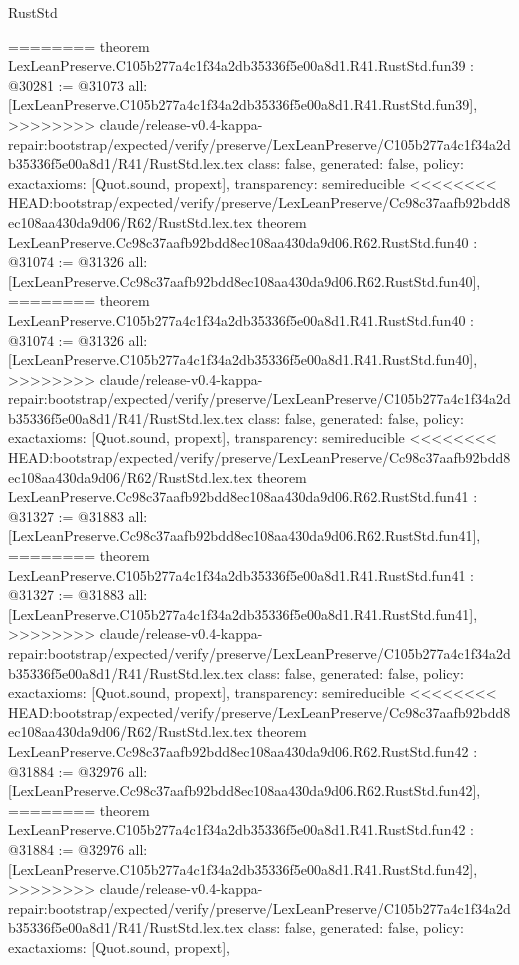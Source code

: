\begin{lexlean}{RustStd}
\begin{coremodule}
{\begin{coremodule}
{{{{{{{{{{{{{{{{{{{{{{{{{{{{{{{{{{{{{{{{{{========
theorem LexLeanPreserve.C105b277a4c1f34a2db35336f5e00a8d1.R41.RustStd.fun39 : @30281 := @31073 {
  all: [LexLeanPreserve.C105b277a4c1f34a2db35336f5e00a8d1.R41.RustStd.fun39],
>>>>>>>> claude/release-v0.4-kappa-repair:bootstrap/expected/verify/preserve/LexLeanPreserve/C105b277a4c1f34a2db35336f5e00a8d1/R41/RustStd.lex.tex
  class: false,
  generated: false,
  policy: exact{axioms: [Quot.sound, propext]},
  transparency: semireducible
}
<<<<<<<< HEAD:bootstrap/expected/verify/preserve/LexLeanPreserve/Cc98c37aafb92bdd8ec108aa430da9d06/R62/RustStd.lex.tex
theorem LexLeanPreserve.Cc98c37aafb92bdd8ec108aa430da9d06.R62.RustStd.fun40 : @31074 := @31326 {
  all: [LexLeanPreserve.Cc98c37aafb92bdd8ec108aa430da9d06.R62.RustStd.fun40],
========
theorem LexLeanPreserve.C105b277a4c1f34a2db35336f5e00a8d1.R41.RustStd.fun40 : @31074 := @31326 {
  all: [LexLeanPreserve.C105b277a4c1f34a2db35336f5e00a8d1.R41.RustStd.fun40],
>>>>>>>> claude/release-v0.4-kappa-repair:bootstrap/expected/verify/preserve/LexLeanPreserve/C105b277a4c1f34a2db35336f5e00a8d1/R41/RustStd.lex.tex
  class: false,
  generated: false,
  policy: exact{axioms: [Quot.sound, propext]},
  transparency: semireducible
}
<<<<<<<< HEAD:bootstrap/expected/verify/preserve/LexLeanPreserve/Cc98c37aafb92bdd8ec108aa430da9d06/R62/RustStd.lex.tex
theorem LexLeanPreserve.Cc98c37aafb92bdd8ec108aa430da9d06.R62.RustStd.fun41 : @31327 := @31883 {
  all: [LexLeanPreserve.Cc98c37aafb92bdd8ec108aa430da9d06.R62.RustStd.fun41],
========
theorem LexLeanPreserve.C105b277a4c1f34a2db35336f5e00a8d1.R41.RustStd.fun41 : @31327 := @31883 {
  all: [LexLeanPreserve.C105b277a4c1f34a2db35336f5e00a8d1.R41.RustStd.fun41],
>>>>>>>> claude/release-v0.4-kappa-repair:bootstrap/expected/verify/preserve/LexLeanPreserve/C105b277a4c1f34a2db35336f5e00a8d1/R41/RustStd.lex.tex
  class: false,
  generated: false,
  policy: exact{axioms: [Quot.sound, propext]},
  transparency: semireducible
}
<<<<<<<< HEAD:bootstrap/expected/verify/preserve/LexLeanPreserve/Cc98c37aafb92bdd8ec108aa430da9d06/R62/RustStd.lex.tex
theorem LexLeanPreserve.Cc98c37aafb92bdd8ec108aa430da9d06.R62.RustStd.fun42 : @31884 := @32976 {
  all: [LexLeanPreserve.Cc98c37aafb92bdd8ec108aa430da9d06.R62.RustStd.fun42],
========
theorem LexLeanPreserve.C105b277a4c1f34a2db35336f5e00a8d1.R41.RustStd.fun42 : @31884 := @32976 {
  all: [LexLeanPreserve.C105b277a4c1f34a2db35336f5e00a8d1.R41.RustStd.fun42],
>>>>>>>> claude/release-v0.4-kappa-repair:bootstrap/expected/verify/preserve/LexLeanPreserve/C105b277a4c1f34a2db35336f5e00a8d1/R41/RustStd.lex.tex
  class: false,
  generated: false,
  policy: exact{axioms: [Quot.sound, propext]},
}}}}}}}}}}}}}}}}}}}}}}}}}}}}}}}}}}}}}}}}}}}}}}
\end{coremodule}}
\end{coremodule}
\end{lexlean}
